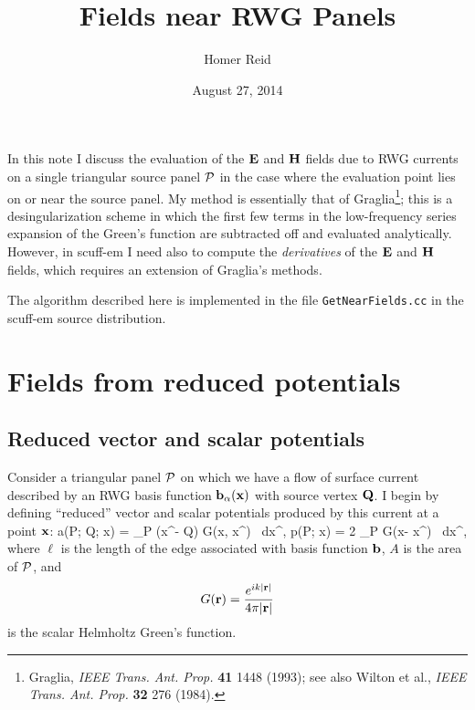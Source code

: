 \documentclass[letterpaper]{article}
\title {Fields near RWG Panels}
\author {Homer Reid}
\date {August 27, 2014}
\begin{document}
\pagestyle{myheadings}
\maketitle

In this note I discuss the evaluation of the
$\mathbf{E}$ and $\mathbf{H}$ fields due to RWG currents
on a single triangular source panel $\mathcal{P}$ in the case 
where the evaluation point lies on or near the source 
panel.
My method is essentially that of
Graglia\footnote{Graglia, \textit{IEEE Trans. Ant. Prop.} 
\textbf{41} 1448 (1993); see also 
Wilton et al., \textit{IEEE Trans. Ant. Prop.} \textbf{32} 
276 (1984).}; this is a desingularization scheme in which  
the first few terms in the low-frequency series expansion of the 
Green's function are subtracted off and evaluated analytically.
However, in {\sc scuff-em} I need also to compute the 
\textit{derivatives} of the $\mathbf{E}$ and $\mathbf{H}$ fields,
which requires an extension of Graglia's methods.

The algorithm described here is implemented in the 
file \texttt{GetNearFields.cc} in the {\sc scuff-em} source
distribution. 

\tableofcontents

\newpage
\section{Fields from reduced potentials} 

\subsection{Reduced vector and scalar potentials}

Consider a triangular panel $\mathcal{P}$ on which we have a flow of 
surface current described by an RWG basis function
$\mathbf{b}_\alpha(\mathbf{x})$ with source vertex $\mathbf{Q}$. I begin by
defining ``reduced'' vector and scalar potentials produced by this 
current at a point $\mathbf{x}$:
{ \vb a(\mc P; \vb Q; \vb x) = 
   \int_{\mc P} (\vb x^\prime - \vb Q) G(\vb x, \vb x^\prime) \, d\vb x^\prime,
   \qquad
   p(\mc P; \vb x) = 2\cdot{}
   \int_{\mc P} G(\vb x- \vb x^\prime) \, d\vb x^\prime,
}
where $\ell$ is the length of the edge associated with basis function
$\mathbf{b}$, $A$ is the area of $\mathcal{P}$, and
$$ G(\mathbf{r})=\frac{e^{ik|\mathbf{r}|}}{4\pi |\mathbf{r}|} $$
is the scalar Helmholtz Green's function.
\end{document}

